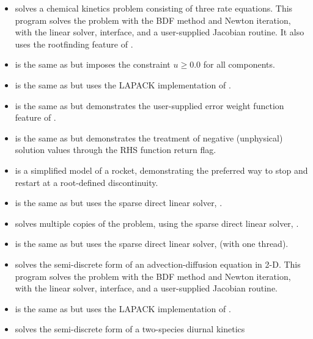 \begin{itemize}
\item {}
  solves a chemical kinetics problem consisting of three rate equations.
  \newline
  This program solves the problem with the BDF method and Newton
  iteration, with the {\sunlinsoldense} linear solver, {\cvls}
  interface, and a user-supplied Jacobian routine.  It also uses the
  rootfinding feature of {\cvode}.
\item {}
  is the same as  but imposes the constraint
  $u \geq 0.0$ for all components.
\item {}
  is the same as  but uses the LAPACK
  implementation of {\sunlinsollapdense}.
\item {}
  is the same as  but demonstrates the user-supplied error
  weight function feature of {\cvode}.
\item {}
  is the same as  but demonstrates the treatment of
  negative (unphysical) solution values through the RHS function
  return flag.
\item {}
  is a simplified model of a rocket, demonstrating the
  preferred way to stop and restart at a root-defined discontinuity.
\item {}
  is the same as  but uses the {\klu} sparse direct
  linear solver, {\sunlinsolklu}.
\item {}
  solves multiple copies of the  problem, using the
  {\klu} sparse direct linear solver, {\sunlinsolklu}.
\item {}
  is the same as  but uses the {\superlumt} sparse
  direct linear solver, {\sunlinsolslumt} (with one thread).
\item {}
  solves the semi-discrete form of an advection-diffusion equation in 2-D.
  \newline
  This program solves the problem with the BDF method and Newton
  iteration, with the {\sunlinsolband} linear solver, {\cvls}
  interface, and a user-supplied Jacobian routine.
\item {}
  is the same as  but uses the LAPACK
  implementation of {\sunlinsollapband}.
\item {}
  solves the semi-discrete form of a two-species diurnal kinetics

\end{itemize}
